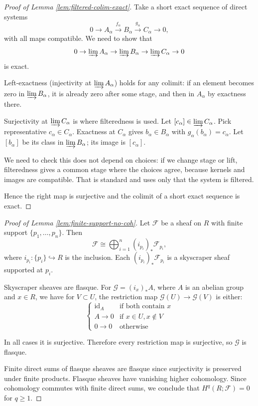 \documentclass[12pt]{article}
\begin{document}
\begin{solution}
    \begin{proof}
        [Proof of Lemma \ref{lem:filtered-colim-exact}]
        Take a short exact sequence of direct systems
        \[
            0 \to A_\alpha \xrightarrow{f_\alpha} B_\alpha \xrightarrow{g_\alpha} C_\alpha \to 0,
        \]
        with all maps compatible. We need to show that
        \[
            0 \to \varinjlim A_\alpha \to \varinjlim B_\alpha \to \varinjlim C_\alpha \to 0
        \]
        is exact.

        Left-exactness (injectivity at $\varinjlim A_\alpha$) holds for any colimit: if an element becomes zero in $\varinjlim B_\alpha$, it is already zero after some stage, and then in $A_\alpha$ by exactness there.

        Surjectivity at $\varinjlim C_\alpha$ is where filteredness is used. Let $[c_\alpha] \in \varinjlim C_\alpha$. Pick representative $c_\alpha\in C_\alpha$. Exactness at $C_\alpha$ gives $b_\alpha\in B_\alpha$ with $g_\alpha(b_\alpha)=c_\alpha$. Let $[b_\alpha]$ be its class in $\varinjlim B_\alpha$; its image is $[c_\alpha]$.

        We need to check this does not depend on choices: if we change stage or lift, filteredness gives a common stage where the choices agree, because kernels and images are compatible. That is standard and uses only that the system is filtered.

        Hence the right map is surjective and the colimit of a short exact sequence is exact.
    \end{proof}

    \begin{proof}[Proof of Lemma \ref{lem:finite-support-no-coh}]
        Let $\mathcal{F}$ be a sheaf on $R$ with finite support $\{p_1,\dots,p_n\}$. Then
        \[
            \mathcal{F} \cong \bigoplus_{i=1}^n (i_{p_i})_* \mathcal{F}_{p_i},
        \]
        where $i_{p_i} : \{p_i\} \hookrightarrow R$ is the inclusion. Each $(i_{p_i})_* \mathcal{F}_{p_i}$ is a skyscraper sheaf supported at $p_i$.

        Skyscraper sheaves are flasque. For $\mathcal{G} = (i_x)_*A$, where $A$ is an abelian group and $x\in R$, we have for $V\subset U$, the restriction map $\mathcal{G}(U)\to \mathcal{G}(V)$ is either:
        \[
            \begin{cases}
                \mathrm{id}_A & \text{if both contain }x    \\
                A\to0         & \text{if }x\in U, x\notin V \\
                0\to0         & \text{otherwise}
            \end{cases}
        \]

        In all cases it is surjective. Therefore every restriction map is surjective, so $\mathcal{G}$ is flasque.

        Finite direct sums of flasque sheaves are flasque since surjectivity is preserved under finite products. Flasque sheaves have vanishing higher cohomology.
        Since cohomology commutes with finite direct sums, we conclude that $H^q(R;\mathcal{F})=0$ for $q\geq1$.
    \end{proof}
\end{solution}
\end{document}

